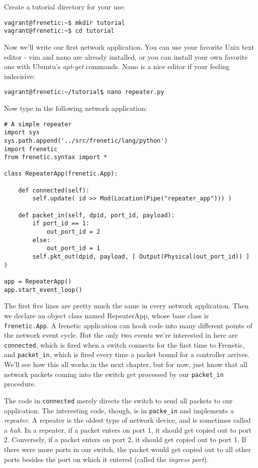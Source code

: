 Create a tutorial directory for your use:
\\
\begin{lstlisting}[style=BashInputStyle]
vagrant@frenetic:~$ mkdir tutorial
vagrant@frenetic:~$ cd tutorial
\end{lstlisting}

Now we'll write our first network application.
You can use your favorite Unix text editor - vim and nano are already installed, or you can install your own favorite
one with Ubuntu's {\it apt-get} commands. 
Nano is a nice editor if your feeling indecisive:
\\
\begin{lstlisting}[style=BashInputStyle]
vagrant@frenetic:~/tutorial$ nano repeater.py
\end{lstlisting}

Now type in the following network application:
\\
\begin{lstlisting}[style=BashInputStyle]
# A simple repeater
import sys
sys.path.append('../src/frenetic/lang/python')
import frenetic
from frenetic.syntax import *

class RepeaterApp(frenetic.App):

    def connected(self):
        self.update( id >> Mod(Location(Pipe("repeater_app"))) )

    def packet_in(self, dpid, port_id, payload):
        if port_id == 1:
            out_port_id = 2
        else:
            out_port_id = 1
        self.pkt_out(dpid, payload, [ Output(Physical(out_port_id)) ] )

app = RepeaterApp()
app.start_event_loop()
\end{lstlisting}

The first five lines are pretty much the same in every network application. 
Then we declare an object class named RepeaterApp, whose base class is \lstinline{frenetic.App}.
A frenetic application can hook code into many different points of the network event cycle.
But the only two events we're interested in here are
\lstinline{connected}, which is fired when a switch connects for the first time to Frenetic, and 
 \lstinline{packet_in}, which is fired every time a packet
bound for a controller arrives.
We'll see how this all works in the next chapter, but for now, just know that all network packets coming 
into the switch get processed by our \lstinline{packet_in} procedure.

The code in \lstinline{connected} merely directs the switch to send all packets to our application.
The interesting code, though, is in \lstinline{packe_in} and implements a {\it repeater}.
A repeater is the oldest type of network device, and is sometimes called a {\it hub}. 
In a repeater, if a packet enters on port 1, it should get copied out to port 2.  
Conversely, if a packet enters on port 2, it should get copied out to port 1.
If there were more ports in our switch, the packet would get copied out to all other ports besides the port on which  it
entered (called the {\it ingress port}).  

